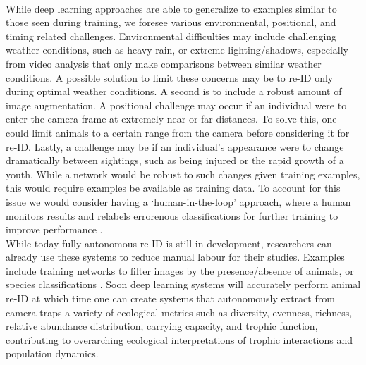 \documentclass[11pt]{article}
\begin{document}
\newline
\\
While deep learning approaches are able to generalize to examples similar to those seen during training, we foresee various environmental, positional, and timing related challenges. Environmental difficulties may include challenging weather conditions, such as heavy rain, or extreme lighting/shadows, especially from video analysis that only make comparisons between similar weather conditions. A possible solution to limit these concerns may be to re-ID only during optimal weather conditions. A second is to include a robust amount of image augmentation. A positional challenge may occur if an individual were to enter the camera frame at extremely near or far distances. To solve this, one could limit animals to a certain range from the camera before considering it for re-ID. Lastly, a challenge may be if an individual's appearance were to change dramatically between sightings, such as being injured or the rapid growth of a youth. While a network would be robust to such changes given training examples, this would require examples be available as training data. To account for this issue we would consider having a `human-in-the-loop' approach, where a human monitors results and relabels errorenous classifications for further training to improve performance \cite{holzinger2016interactive}. 
\newline
\\
While today fully autonomous re-ID is still in development, researchers can already use these systems to reduce manual labour for their studies. Examples include training networks to filter images by the presence/absence of animals, or species classifications \cite{kaggleiWildCam2018, norouzzadehautomatically, schneider2018deep}. Soon deep learning systems will accurately perform animal re-ID at which time one can create systems that autonomously extract from camera traps a variety of ecological metrics such as diversity, evenness, richness, relative abundance distribution, carrying capacity, and trophic function, contributing to overarching ecological interpretations of trophic interactions and population dynamics.
\end{document}
